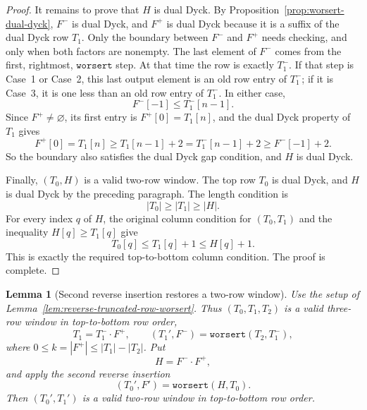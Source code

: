 \documentclass[11pt]{article}
\theoremstyle{plain}
\newtheorem{lemma}[theorem]{Lemma}
\theoremstyle{definition}
\theoremstyle{remark}
\newcommand{\worsert}{\texttt{worsert}}
\begin{document}
\begin{proof}
It remains to prove that \(H\) is dual Dyck.  By
Proposition~\ref{prop:worsert-dual-dyck}, \(F^-\) is dual Dyck, and \(F^+\) is
dual Dyck because it is a suffix of the dual Dyck row \(T_1\).  Only the boundary
between \(F^-\) and \(F^+\) needs checking, and only when both factors are
nonempty.  The last element of \(F^-\) comes from the first, rightmost,
\(\worsert\) step.  At that time the row is exactly \(T_1^-\).  If that step is
Case~1 or Case~2, this last output element is an old row entry of \(T_1^-\); if
it is Case~3, it is one less than an old row entry of \(T_1^-\).  In either
case,
\[
  F^-[-1]\le T_1^-[n-1].
\]
Since \(F^+\ne\varnothing\), its first entry is \(F^+[0]=T_1[n]\), and the dual
Dyck property of \(T_1\) gives
\[
  F^+[0]=T_1[n]\ge T_1[n-1]+2=T_1^-[n-1]+2\ge F^-[-1]+2.
\]
So the boundary also satisfies the dual Dyck gap condition, and \(H\) is dual
Dyck.

Finally, \((T_0,H)\) is a valid two-row window.  The top row \(T_0\) is dual
Dyck, and \(H\) is dual Dyck by the preceding paragraph.  The length condition
is
\[
  |T_0|\ge |T_1|\ge |H|.
\]
For every index \(q\) of \(H\), the original column condition for \((T_0,T_1)\)
and the inequality \(H[q]\ge T_1[q]\) give
\[
  T_0[q]\le T_1[q]+1\le H[q]+1.
\]
This is exactly the required top-to-bottom column condition.  The proof is
complete.
\end{proof}


\begin{lemma}[Second reverse insertion restores a two-row window]
\label{lem:second-reverse-insertion-valid-two-row}
Use the setup of Lemma~\ref{lem:reverse-truncated-row-worsert}.  Thus
\((T_0,T_1,T_2)\) is a valid three-row window in top-to-bottom row order,
\[
  T_1=T_1^-\cdot F^+,
  \qquad
  (T_1',F^-)=\worsert(T_2,T_1^-),
\]
where \(0\le k=|F^+|\le |T_1|-|T_2|\).  Put
\[
  H=F^-\cdot F^+,
\]
and apply the second reverse insertion
\[
  (T_0',F')=\worsert(H,T_0).
\]
Then \((T_0',T_1')\) is a valid two-row window in top-to-bottom row order.
\end{lemma}
\end{document}
